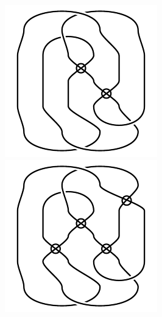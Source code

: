 \begin{figure}[H]
\begin{minipage}[b]{.18\linewidth}
\centering
\includegraphics[width=\linewidth]{../data/virtual_4_12.png}
\end{minipage}
\begin{minipage}[b]{.18\linewidth}
\centering
\includegraphics[width=\linewidth]{../data/virtual_4_13.png}

\end{minipage}
\end{figure}
